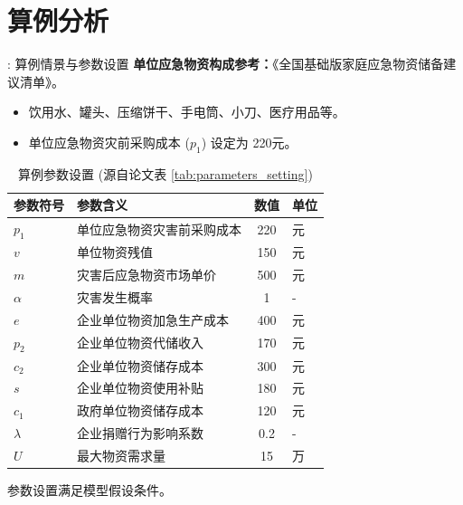 \documentclass[9pt]{beamer}
\begin{document}
\section{算例分析}
\begin{frame}{\insertsectionhead: 算例情景与参数设置}
    \textbf{单位应急物资构成参考：}《全国基础版家庭应急物资储备建议清单》\cite{china_emergency_management_2020}。
    \begin{itemize}
        \item 饮用水、罐头、压缩饼干、手电筒、小刀、医疗用品等。
        \item 单位应急物资灾前采购成本 ($p_1$) 设定为 220元。
    \end{itemize}
    \begin{table}
    \centering
    \caption{算例参数设置 (源自论文表 \ref{tab:parameters_setting})}
\small
    \begin{tabular}{llcl}
    \toprule
    参数符号 & 参数含义                     & 数值    & 单位 \\
    \midrule
    $p_1$      & 单位应急物资灾害前采购成本   & 220 & 元   \\
    $v$        & 单位物资残值                 & 150   & 元   \\
    $m$        & 灾害后应急物资市场单价       & 500   & 元   \\
    $\alpha$   & 灾害发生概率                 & 1     & -    \\
    $e$        & 企业单位物资加急生产成本     & 400   & 元   \\
    $p_2$      & 企业单位物资代储收入         & 170   & 元   \\
    $c_2$      & 企业单位物资储存成本         & 300    & 元   \\
    $s$        & 企业单位物资使用补贴         & 180   & 元   \\
    $c_1$      & 政府单位物资储存成本         & 120   & 元   \\
    $\lambda$  & 企业捐赠行为影响系数         & 0.2   & -    \\
    $U$        & 最大物资需求量               & 15 & 万 \\
    \bottomrule
    \end{tabular}
    \end{table}
    参数设置满足模型假设条件。
\end{frame}
\end{document}
